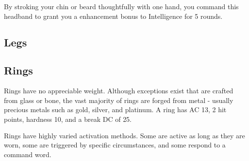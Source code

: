  By stroking your chin or beard thoughtfully with one hand, you command this headband to grant you a  enhancement bonus to Intelligence for 5 rounds.


\subsection{Legs}

\subsection{Rings}

 Rings have no appreciable weight. Although exceptions exist that are crafted from glass or bone, the vast majority of rings are forged from metal - usually precious metals such as gold, silver, and platinum. A ring has AC 13, 2 hit points, hardness 10, and a break DC of 25.

 Rings have highly varied activation methods. Some are active as long as they are worn, some are triggered by specific circumstances, and some respond to a command word.

\begin{comment}
\begin{dtable}
\lcaption{Rings}
\begin{tabularx}{\columnwidth}{>{\lcol}X l}
Ring & Market Price \\
Protection \plus1 & 2,000 gp \\
Feather falling & 2,200 gp \\
Climbing & 2,500 gp \\
Jumping & 2,500 gp \\
Sustenance & 2,500 gp \\
Swimming & 2,500 gp \\
Mind shielding & 8,000 gp \\
Protection \plus2 & 8,000 gp \\
Climbing, improved & 10,000 gp \\
Jumping, improved & 10,000 gp \\
Swimming, improved & 10,000 gp \\
Energy resistance, minor & 12,000 gp \\
Protection \plus3 & 18,000 gp \\
Energy resistance, major & 28,000 gp \\
Protection \plus4 & 32,000 gp \\
Energy resistance, greater & 44,000 gp \\
Protection \plus5 & 50,000 gp \\
\end{tabularx}
\end{dtable}
\end{comment}



